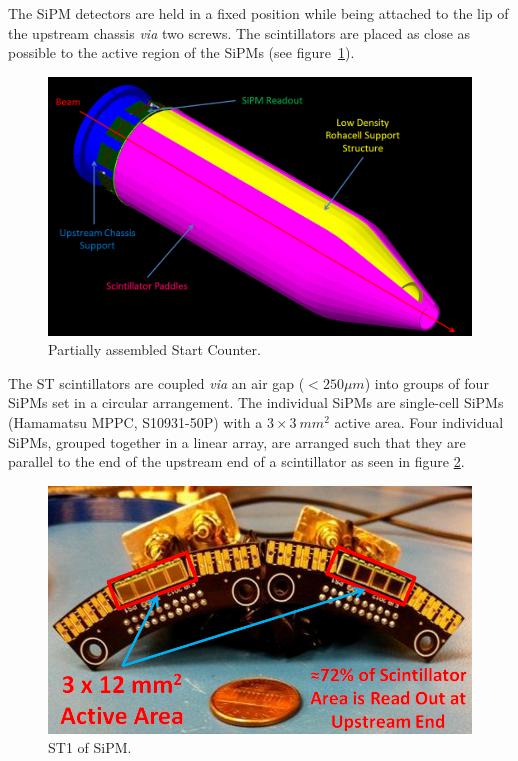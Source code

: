 The SiPM detectors are held in a fixed position while being attached to the lip of the upstream chassis \emph{via} two screws.  The scintillators are placed as close as possible to the active region of the SiPMs (see figure~\ref{fig:Partially Assembled Start Counter}).
\begin{figure}[!htb]
	\centering
	\includegraphics[width=1.0\columnwidth]{design/figs/Labeled_Partially_Assembled_Detector}
	\caption[Partially assembled Start Counter]{Partially assembled Start Counter.}
	\label{fig:Partially Assembled Start Counter}
\end{figure}

The ST scintillators are coupled \emph{via} an air gap ($< 250 \mu m$) into groups of four SiPMs set in a circular arrangement.  The individual SiPMs are single-cell SiPMs (Hamamatsu MPPC, S10931-50P) with a $3 \times 3\ mm^{2}$ active area.  Four individual SiPMs, grouped together in a linear array, are arranged such that they are parallel to the end of the upstream end of a scintillator as seen in figure \ref{fig:Labeled ST1}.
\begin{figure}[!htb]
	\centering
	\includegraphics[width=1.0\columnwidth]{design/figs/Labeled_ST1_Penny}
	\caption[ST1 of SiPM]{ST1 of SiPM.}
	\label{fig:Labeled ST1}
\end{figure}  

